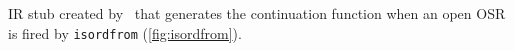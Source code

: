 \label{fig:isordstub} IR stub created by \osrkit\ that generates the continuation function when an open OSR is fired by {\tt isordfrom} (\myfigure\ref{fig:isordfrom}).
